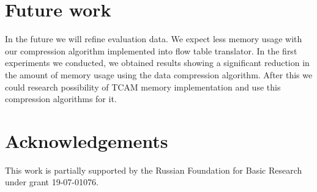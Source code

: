 \documentclass[conference]{IEEEtran}
\begin{document}
    \section{Future work}
        In the future we will refine evaluation data. 
        We expect less memory usage with our compression algorithm implemented into flow table translator. 
        In the first experiments we conducted, we obtained results showing a significant reduction in the amount 
        of memory usage using the data compression algorithm. After this we could research possibility 
        of TCAM memory implementation and use this compression algorithms for it.
    \section{Acknowledgements}
        This work is partially supported by the Russian Foundation for Basic Research under grant 19-07-01076.
\printbibliography{}
\end{document}
